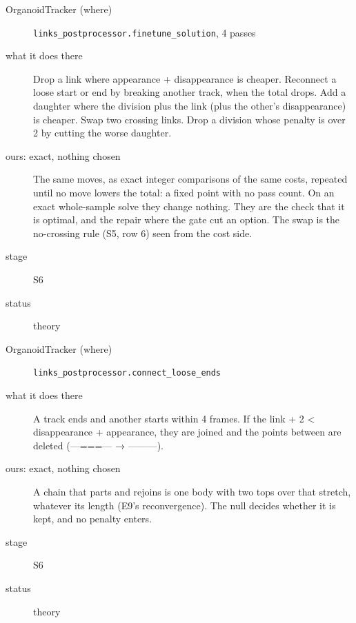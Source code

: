 \begin{description}
\item[{OrganoidTracker (where)}] \texttt{links\_\allowbreak{}postprocessor.\allowbreak{}finetune\_\allowbreak{}solution}, 4 passes
\item[{what it does there}] Drop a link where appearance + disappearance is cheaper. Reconnect a loose start or end by breaking another track, when the total drops. Add a daughter where the division plus the link (plus the other's disappearance) is cheaper. Swap two crossing links. Drop a division whose penalty is over 2 by cutting the worse daughter.
\item[{ours: exact, nothing chosen}] The same moves, as exact integer comparisons of the same costs, repeated until no move lowers the total: a fixed point with no pass count. On an exact whole-sample solve they change nothing. They are the check that it is optimal, and the repair where the gate cut an option. The swap is the no-crossing rule (S5, row 6) seen from the cost side.
\item[{stage}] S6
\item[{status}] theory
\end{description}

\begin{description}
\item[{OrganoidTracker (where)}] \texttt{links\_\allowbreak{}postprocessor.\allowbreak{}connect\_\allowbreak{}loose\_\allowbreak{}ends}
\item[{what it does there}] A track ends and another starts within 4 frames. If the link + 2 < disappearance + appearance, they are joined and the points between are deleted (---===--- → ---------).
\item[{ours: exact, nothing chosen}] A chain that parts and rejoins is one body with two tops over that stretch, whatever its length (E9's reconvergence). The null decides whether it is kept, and no penalty enters.
\item[{stage}] S6
\item[{status}] theory
\end{description}

